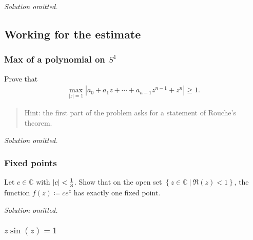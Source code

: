 \emph{Solution omitted.}

\hypertarget{working-for-the-estimate}{%
\subsection{Working for the estimate}\label{working-for-the-estimate}}

\hypertarget{max-of-a-polynomial-on-s1}{%
\subsubsection{\texorpdfstring{Max of a polynomial on
\(S^1\)}{Max of a polynomial on S\^{}1}}\label{max-of-a-polynomial-on-s1}}

\begin{problem}

Prove that
\begin{align*}
\max_{{\left\lvert {z} \right\rvert} = 1} {\left\lvert {a_0 + a_1 z + \cdots + a_{n-1}z^{n-1} + z^n} \right\rvert} \geq 1
.\end{align*}

\begin{quote}
Hint: the first part of the problem asks for a statement of Rouche's
theorem.
\end{quote}

\end{problem}

\emph{Solution omitted.}

\hypertarget{fixed-points}{%
\subsubsection{Fixed points}\label{fixed-points}}

\begin{problem}[?]

Let \(c\in {\mathbb{C}}\) with
\({\left\lvert {c} \right\rvert} < {1\over 3}\). Show that on the open
set
\(\left\{{z\in {\mathbb{C}}{~\mathrel{\Big\vert}~}\Re(z) < 1}\right\}\),
the function \(f(z) \coloneqq ce^z\) has exactly one fixed point.

\end{problem}

\emph{Solution omitted.}

\hypertarget{zsinz1}{%
\subsubsection{\texorpdfstring{\(z\sin(z)=1\)}{z\textbackslash sin(z)=1}}\label{zsinz1}}

